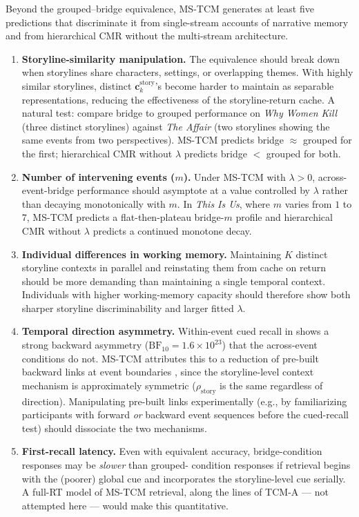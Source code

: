 \documentclass[10pt]{article}
\newcommand{\cstory}{\mathbf{c}^{\mathrm{story}}}
\newcommand{\rhostory}{\rho_{\mathrm{story}}}
\begin{document}
Beyond the grouped--bridge equivalence, MS-TCM generates at least
five predictions that discriminate it from single-stream accounts of
narrative memory and from hierarchical CMR without the
multi-stream architecture.

\begin{enumerate}
\item \textbf{Storyline-similarity manipulation.} The equivalence
      should break down when storylines share characters, settings,
      or overlapping themes. With highly similar storylines, distinct
      $\cstory_k$'s become harder to maintain as separable
      representations, reducing the effectiveness of the
      storyline-return cache. A natural test: compare bridge to
      grouped performance on \emph{Why Women Kill} (three
      distinct storylines) against \emph{The Affair} (two storylines
      showing the same events from two perspectives). MS-TCM
      predicts bridge $\approx$ grouped for the first; hierarchical
      CMR without $\lambda$ predicts bridge $<$ grouped for both.
\item \textbf{Number of intervening events ($m$).} Under MS-TCM with
      $\lambda > 0$, across-event-bridge performance should
      asymptote at a value controlled by $\lambda$ rather than
      decaying monotonically with $m$. In \emph{This Is Us}, where
      $m$ varies from $1$ to $7$, MS-TCM predicts a flat-then-plateau
      bridge-$m$ profile and hierarchical CMR without $\lambda$
      predicts a continued monotone decay.
\item \textbf{Individual differences in working memory.} Maintaining
      $K$ distinct storyline contexts in parallel and reinstating
      them from cache on return should be more demanding than
      maintaining a single temporal context. Individuals with
      higher working-memory capacity should therefore show both
      sharper storyline discriminability and larger fitted
      $\lambda$.
\item \textbf{Temporal direction asymmetry.} Within-event cued
      recall in \citet{XuDuncanManning} shows a strong backward
      asymmetry ($\mathrm{BF}_{10} = 1.6\times 10^{23}$) that the
      across-event conditions do not. MS-TCM attributes this to a
      reduction of pre-built backward links at event boundaries
      \citep{EzzaDav11,XuEtAl2024}, since the storyline-level
      context mechanism is approximately symmetric ($\rhostory$ is
      the same regardless of direction). Manipulating pre-built
      links experimentally (e.g., by familiarizing participants
      with forward \emph{or} backward event sequences before the
      cued-recall test) should dissociate the two mechanisms.
\item \textbf{First-recall latency.} Even with equivalent accuracy,
      bridge-condition responses may be \emph{slower} than grouped-
      condition responses if retrieval begins with the (poorer)
      global cue and incorporates the storyline-level cue
      serially. A full-RT model of MS-TCM retrieval, along the
      lines of TCM-A \citep{SedeEtal08} --- not attempted here ---
      would make this quantitative.
\end{enumerate}
\end{document}
